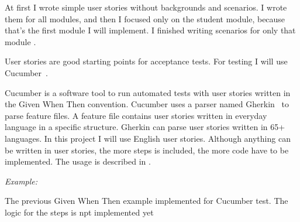 At first I wrote simple user stories without backgrounds and scenarios. I wrote them for all modules, and then I focused only on the student module, because that's the first module I will implement. I finished writing scenarios for only that module .

\label{spec-cucumber}

User stories are good starting points for acceptance tests. For testing I will use Cucumber~\cite{Cucumber}. 

Cucumber is a software tool to run automated tests with user stories written in the Given When Then convention. Cucumber uses a parser named Gherkin~\cite{Cucumber-gherkin} to parse feature files. 
A feature file contains user stories written in everyday language in a specific structure. Gherkin can parse user stories written in 65+ languages. In this project I will use English user stories. Although anything can be written in user stories, the more steps is included, the more code have to be implemented. The usage is described in .

\emph{Example:}

The previous Given When Then example implemented for Cucumber test. The logic for the steps is npt implemented yet

